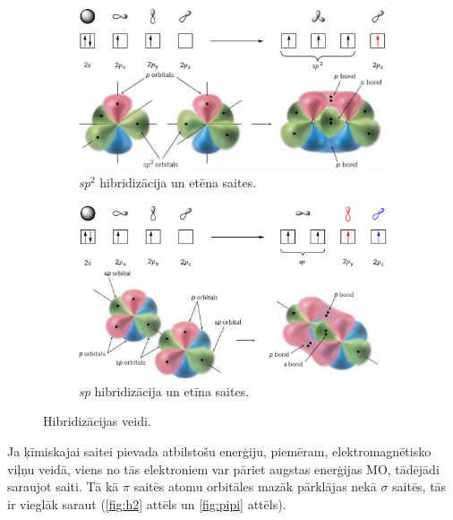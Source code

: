 \documentclass[12pt,a4paper]{article}
\newcommand{\figref}[1]{\ref{#1} attēls}
\begin{document}
\begin{figure}[H]
    \centering
    \begin{subfigure}[b]{0.45\textwidth}
        \centering
        \includegraphics[width=\textwidth]{atteli/ethylene.png}
        \caption{\textit{sp}$^2$ hibridizācija un etēna saites.}
        \label{fig:ethylene}
    \end{subfigure}
    \hfill
    \begin{subfigure}[b]{0.45\textwidth}
        \centering
        \includegraphics[width=\textwidth]{atteli/acetylene.png}
        \caption{\textit{sp} hibridizācija un etīna saites.}
        \label{fig:acetylene}
    \end{subfigure}
    \caption{Hibridizācijas veidi.}
\end{figure}

Ja ķīmiskajai saitei pievada atbilstošu enerģiju, piemēram, elektromagnētisko viļņu veidā, viens no tās elektroniem var pāriet augstas enerģijas MO, tādējādi saraujot saiti. Tā kā $\pi$ saitēs atomu orbitāles mazāk pārklājas nekā $\sigma$ saitēs, tās ir vieglāk saraut (\figref{fig:h2} un \figref{fig:pipi}).
\end{document}
